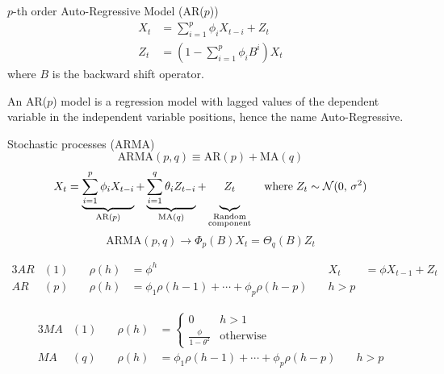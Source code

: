 \begin{definition}{$p$-th order Auto-Regressive Model (AR($p$))}{}
    \begin{align*}
        X_t &= \sum_{i=1}^p \phi_i X_{t-i} + Z_t \\
        Z_t &= \left(
            1 - \sum_{i=1}^p \phi_i B^i
            \right) X_t
    \end{align*}
    where $B$ is the backward shift operator.

    \tcblower

    An AR($p$) model is a regression model with lagged values of the dependent
    variable in the independent variable positions, hence the name Auto-Regressive.
\end{definition}






\begin{definition}{Stochastic processes (ARMA)}{}
	\begin{equation*}
		\text{ARMA}(p,q) \equiv \text{AR}(p) + \text{MA}(q)
	\end{equation*}
	\begin{equation*}
		X_t = \underbrace{
			\sum_{i=1}^p \phi_i X_{t-i}
		}_{\text{AR}(p)}
		+ \underbrace{
			\sum_{i=1}^q \theta_i Z_{t-i}
		}_{\text{MA}(q)}
		+ \underbrace{
			Z_t
			\vphantom{\sum_{i=1}^q}
		}_{ \substack{\text{Random} \\ \text{component}} }
		\quad \text{where} \; Z_t \sim \mathcal{N}(0,\,\sigma^2)
	\end{equation*}
	\begin{equation*}
		\text{ARMA}(p,q) \rightarrow \Phi_p(B) X_t = \Theta_q(B) Z_t
	\end{equation*}
\end{definition}


\begin{alignat*}{3}
	AR & (1) & \quad \rho(h) & = \phi^h                                       & \quad X_t   & = \phi X_{t-1} + Z_t \\
	AR & (p) & \quad \rho(h) & = \phi_1 \rho(h-1) + \cdots + \phi_p \rho(h-p) & \quad h > p
\end{alignat*}

\begin{alignat*}{3}
	MA & (1) & \quad \rho(h) & = \begin{cases}
		                             0                       & h > 1            \\
		                             \frac{\phi}{1-\theta^2} & \text{otherwise}
	                             \end{cases}                 \\
	MA & (q) & \quad \rho(h) & = \phi_1 \rho(h-1) + \cdots + \phi_p \rho(h-p) & \quad h > p
\end{alignat*}

